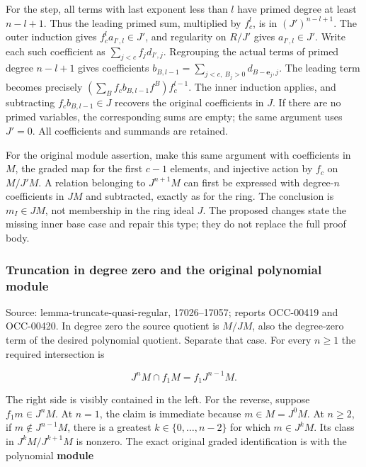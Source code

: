 For the step, all terms with last exponent less than \(l\) have primed degree at least \(n-l+1\). Thus the leading primed sum, multiplied by \(f_c^l\), is in \((J')^{n-l+1}\). The outer induction gives \(f_c^l a_{I',l}\in J'\), and regularity on \(R/J'\) gives \(a_{I',l}\in J'\). Write each such coefficient as \(\sum_{j<c}f_jd_{I',j}\). Regrouping the actual terms of primed degree \(n-l+1\) gives coefficients \(b_{B,l-1}=\sum_{j<c,\ B_j>0}d_{B-\mathbf e_j,j}\). The leading term becomes precisely \((\sum_B f_cb_{B,l-1}f^B)f_c^{l-1}\). The inner induction applies, and subtracting \(f_cb_{B,l-1}\in J\) recovers the original coefficients in \(J\). If there are no primed variables, the corresponding sums are empty; the same argument uses \(J'=0\). All coefficients and summands are retained.

For the original module assertion, make this same argument with coefficients in \(M\), the graded map for the first \(c-1\) elements, and injective action by \(f_c\) on \(M/J'M\). A relation belonging to \(J^{n+1}M\) can first be expressed with degree-\(n\) coefficients in \(JM\) and subtracted, exactly as for the ring. The conclusion is \(m_I\in JM\), not membership in the ring ideal \(J\). The proposed changes state the missing inner base case and repair this type; they do not replace the full proof body.

\subsubsection{Truncation in degree zero and the original polynomial module}\label{algebra-proof-006-truncation-in-degree-zero-and-the-original-polynomial-module}

Source: lemma-\AlgebraIdentifierBreak{}truncate-\AlgebraIdentifierBreak{}quasi-\AlgebraIdentifierBreak{}regular, 17026--17057; reports OCC-00419 and OCC-00420. In degree zero the source quotient is \(M/JM\), also the degree-zero term of the desired polynomial quotient. Separate that case. For every \(n\geq1\) the required intersection is

\[
J^nM\cap f_1M=f_1J^{n-1}M.
\]

The right side is visibly contained in the left. For the reverse, suppose \(f_1m\in J^nM\). At \(n=1\), the claim is immediate because \(m\in M=J^0M\). At \(n\geq2\), if \(m\notin J^{n-1}M\), there is a greatest \(k\in\{0,\ldots,n-2\}\) for which \(m\in J^kM\). Its class in \(J^kM/J^{k+1}M\) is nonzero. The exact original graded identification is with the polynomial \textbf{module}

